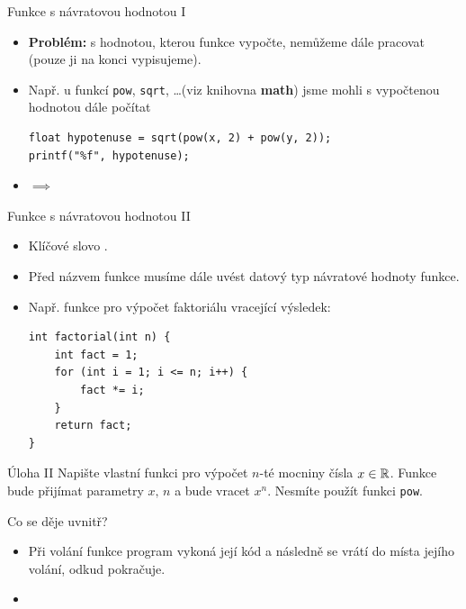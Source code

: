 \documentclass[14pt,aspectratio=169]{beamer}
\begin{document}
    \begin{frame}[t,fragile]{Funkce s návratovou hodnotou I}
        \begin{itemize}
            \item \textbf{Problém:} s hodnotou, kterou funkce vypočte, nemůžeme dále pracovat (pouze ji na konci vypisujeme).
            \item Např. u funkcí \texttt{pow}, \texttt{sqrt}, \dots (viz knihovna \textbf{math}) jsme mohli s vypočtenou hodnotou dále počítat
            \begin{lstlisting}
float hypotenuse = sqrt(pow(x, 2) + pow(y, 2));
printf("%f", hypotenuse);
            \end{lstlisting}
            \item $\implies$ 
        \end{itemize}
    \end{frame}

    \begin{frame}[t,fragile]{Funkce s návratovou hodnotou II}
        \begin{itemize}
            \item Klíčové slovo .
            \item Před názvem funkce musíme dále uvést datový typ návratové hodnoty funkce.
            \item Např. funkce pro výpočet faktoriálu vracející výsledek:
            \begin{lstlisting}
int factorial(int n) {
    int fact = 1;
    for (int i = 1; i <= n; i++) {
        fact *= i;
    }
    return fact;
}
            \end{lstlisting}
        \end{itemize}
    \end{frame}

    \begin{frame}{Úloha II}
        Napište vlastní funkci pro výpočet $n$-té mocniny čísla $x\in\mathbb{R}$. Funkce bude přijímat parametry $x,\,n$ a bude vracet $x^n$. Nesmíte použít funkci \texttt{pow}. 
    \end{frame}

    \begin{frame}[t]{Co se děje uvnitř?}
        \begin{itemize}
            \item Při volání funkce program vykoná její kód a následně se vrátí do místa jejího volání, odkud pokračuje.
            \item {}
        \end{itemize}
    \end{frame}
\end{document}
